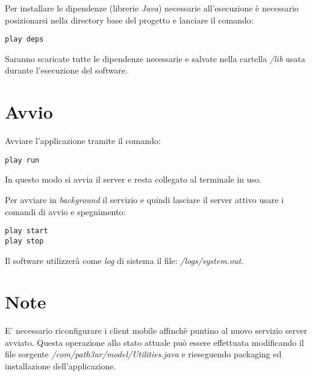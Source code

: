 Per installare le dipendenze (librerie \emph{Java}) necessarie all'esecuzione è necessario posizionarsi nella directory base del progetto e lanciare il comando:
\begin{verbatim}
play deps
\end{verbatim}
Saranno scaricate tutte le dipendenze necessarie e salvate nella cartella \emph{/lib} usata durante l'esecuzione del software.

\section{Avvio}
Avviare l'applicazione tramite il comando:
\begin{verbatim}
play run
\end{verbatim}
In questo modo si avvia il server e resta collegato al terminale in uso. 

Per avviare in \emph{background} il servizio e quindi lasciare il server attivo usare i comandi di avvio e spegnimento:
\begin{verbatim}
play start
play stop
\end{verbatim}

Il software utilizzerà come \emph{log} di sistema il file: \emph{/logs/system.out}.

\section{Note}
E' necessario riconfigurare i client mobile affinchè puntino al nuovo servizio server avviato. Questa operazione allo stato attuale può essere effettuata modificando il file sorgente \emph{/com/path3ar/model/Utilities.java} e rieseguendo packaging ed installazione dell'applicazione.
